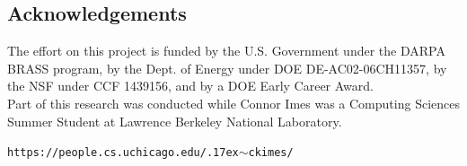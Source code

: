\documentclass[a0,portrait]{a0poster}
\renewcommand{\small}{\fontsize{24.88}{30}\selectfont}
\begin{document}
\begin{multicols}{2}

\section*{Acknowledgements}

\small
The effort on this project is funded by the U.S. Government under the DARPA BRASS program, by the Dept. of Energy under DOE DE-AC02-06CH11357, by the NSF under CCF 1439156, and by a DOE Early Career Award.\\
Part of this research was conducted while Connor Imes was a Computing Sciences Summer Student at Lawrence Berkeley National Laboratory.


\end{multicols}

\begin{center}
\vspace{0.5cm}
\Large \texttt{https://people.cs.uchicago.edu/{\raise.17ex\hbox{$\scriptstyle\mathtt{\sim}$}}ckimes/}
\end{center}
\end{document}
